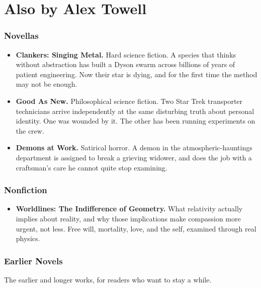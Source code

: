 \chapter*{Also by Alex Towell}

\subsection*{Novellas}

\begin{itemize}
\setlength{\itemsep}{1em}
\item \textbf{Clankers: Singing Metal.} Hard science fiction. A species that thinks without abstraction has built a Dyson swarm across billions of years of patient engineering. Now their star is dying, and for the first time the method may not be enough.

\item \textbf{Good As New.} Philosophical science fiction. Two Star Trek transporter technicians arrive independently at the same disturbing truth about personal identity. One was wounded by it. The other has been running experiments on the crew.

\item \textbf{Demons at Work.} Satirical horror. A demon in the atmospheric-hauntings department is assigned to break a grieving widower, and does the job with a craftsman's care he cannot quite stop examining.
\end{itemize}

\subsection*{Nonfiction}

\begin{itemize}
\setlength{\itemsep}{1em}
\item \textbf{Worldlines: The Indifference of Geometry.} What relativity actually implies about reality, and why those implications make compassion more urgent, not less. Free will, mortality, love, and the self, examined through real physics.
\end{itemize}

\subsection*{Earlier Novels}

\noindent The earlier and longer works, for readers who want to stay a while.

